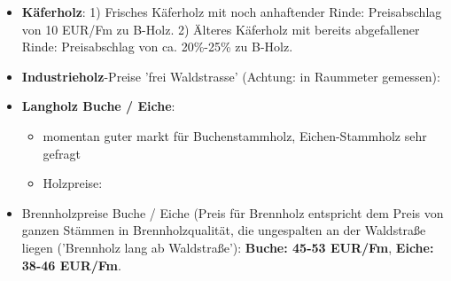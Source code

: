 \documentclass{article}
\begin{document}
\begin{itemize}
\begin{itemize}
        \end{itemize} 
        	

\item \textbf{Käferholz}: 1) Frisches Käferholz mit noch anhaftender Rinde: Preisabschlag von 10 EUR/Fm zu B-Holz. 2) Älteres Käferholz mit bereits abgefallener Rinde: Preisabschlag von ca. 20\%-25\% zu B-Holz.

\item \textbf{Industrieholz}-Preise 'frei Waldstrasse' (Achtung: in Raummeter gemessen):

\begin{figure}[htb]
	\centering
\end{figure}        	
        	
        	
\newpage       	
\item \textbf{Langholz Buche / Eiche}:

        \begin{itemize} 
        	
           \item momentan guter markt für Buchenstammholz, Eichen-Stammholz sehr gefragt
           
           \item Holzpreise:
        	
        	\begin{figure}[htb]
        	  \centering
            \end{figure}

        \end{itemize} 


\item Brennholzpreise Buche / Eiche (Preis für Brennholz entspricht dem Preis von ganzen Stämmen in Brennholzqualität, die ungespalten an der Waldstraße liegen ('Brennholz lang ab Waldstraße'): \textbf{Buche: 45-53 EUR/Fm}, \textbf{Eiche: 38-46 EUR/Fm}.



\end{itemize}
\end{document}
